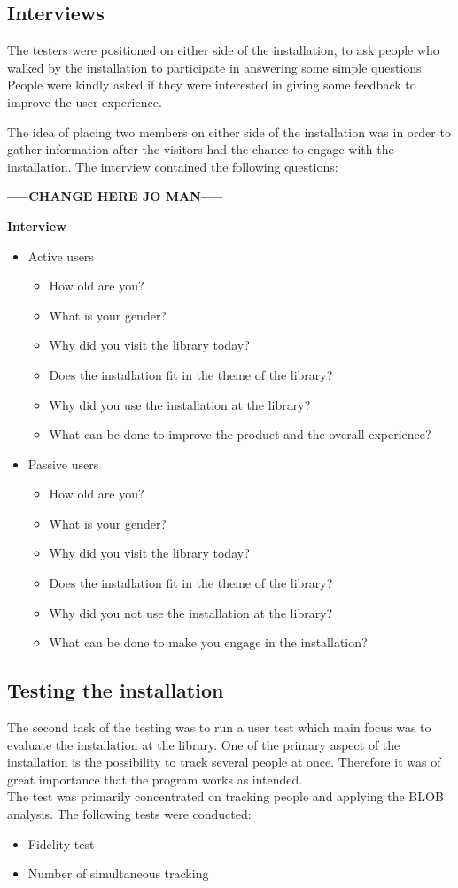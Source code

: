 \subsection{Interviews}
The testers were positioned on either side of the installation, to ask people who walked by the installation to participate in answering some simple questions. People were kindly asked if they were interested in giving some feedback to improve the user experience.

The idea of placing two members on either side of the installation was in order to gather information after the visitors had the chance to engage with the installation. The interview contained the following questions:

\textbf{-----CHANGE HERE JO MAN-----}

\textbf{Interview}
\begin{itemize}
\item Active users
\begin{itemize}
\item How old are you?
\item What is your gender?
\item Why did you visit the library today?
\item Does the installation fit in the theme of the library?
\item Why did you use the installation at the library?
\item What can be done to improve the product and the overall experience?
\end{itemize}
\item Passive users
\begin{itemize}
\item How old are you?
\item What is your gender? 
\item Why did you visit the library today?
\item Does the installation fit in the theme of the library?
\item Why did you not use the installation at the library?
\item What can be done to make you engage in the installation?
\end{itemize}
\end{itemize}

\subsection{Testing the installation}
The second task of the testing was to run a user test which main focus was to evaluate the installation at the library. One of the primary aspect of the installation is the possibility to track several people at once. Therefore it was of great importance that the program works as intended.\\
The test was primarily concentrated on tracking people and applying the BLOB analysis. The following tests were conducted: 
\begin{itemize}
\item Fidelity test
\item Number of simultaneous tracking
\end{itemize}

